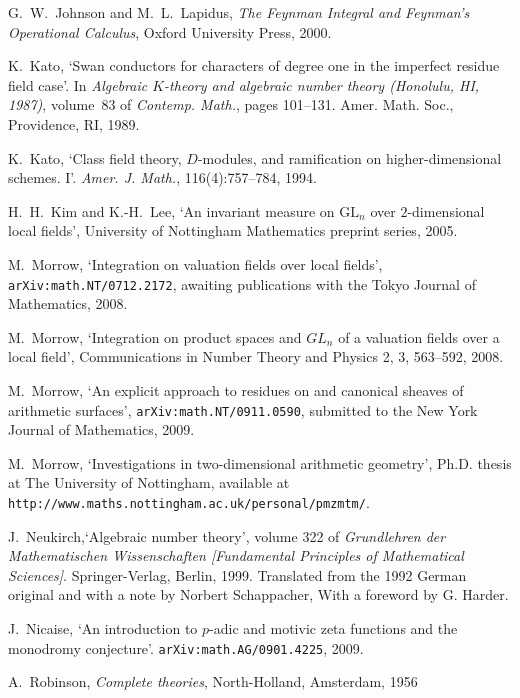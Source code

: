 \documentclass{lmsMODIFIED}
\begin{document}
\begin{thebibliography}{9}
{\sc G.~W.~Johnson and M.~L.~Lapidus}, {\em The Feynman Integral and Feynman's
  Operational Calculus}, Oxford University Press, 2000.

{\sc K.~Kato}, {`Swan conductors for characters of degree one in the imperfect residue field case'}. In {\em Algebraic {$K$}-theory and algebraic number theory ({H}onolulu, {HI}, 1987)}, volume~83 of {\em Contemp. Math.}, pages 101--131. Amer. Math. Soc., Providence, RI, 1989.

{\sc K.~Kato}, {`Class field theory, {$D$}-modules, and ramification on higher-dimensional schemes. {I}'}. {\em Amer. J. Math.}, 116(4):757--784, 1994.

{\sc H.~H.~Kim and K.-H.~Lee}, {`An invariant measure on $\mbox{GL}_n$ over
  $2$-dimensional local fields'}, University of Nottingham Mathematics preprint
  series, 2005.

{\sc M.~Morrow}, {`Integration on valuation fields over local fields'}, {\tt arXiv:math.NT/0712.2172}, awaiting publications with the Tokyo Journal of Mathematics, 2008.

{\sc M.~Morrow}, {`Integration on product spaces and $GL_n$ of a valuation fields over a local field'}, Communications in Number Theory and Physics 2, 3, 563--592, 2008.

{\sc M.~Morrow}, {`An explicit approach to residues on and canonical sheaves of arithmetic surfaces'}, {\tt arXiv:math.NT/0911.0590}, submitted to the New York Journal of Mathematics, 2009.

{\sc M.~Morrow}, {`Investigations in two-dimensional arithmetic geometry'}, Ph.D. thesis at The University of Nottingham, available at {\tt http://www.maths.nottingham.ac.uk/personal/pmzmtm/}.

{\sc J.~Neukirch},{`Algebraic number theory'}, volume 322 of {\em Grundlehren der Mathematischen Wissenschaften [Fundamental Principles of Mathematical Sciences]}. Springer-Verlag, Berlin, 1999. Translated from the 1992 German original and with a note by Norbert Schappacher, With a foreword by G. Harder.

{\sc J.~Nicaise}, {`An introduction to $p$-adic and motivic zeta functions and the monodromy conjecture'}. {\tt arXiv:math.AG/0901.4225}, 2009.

{\sc A.~Robinson}, {\em Complete theories}, North-Holland, Amsterdam, 1956


\end{thebibliography}
\end{document}
